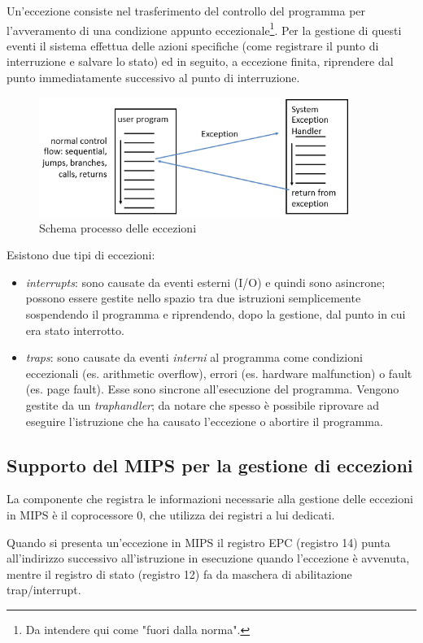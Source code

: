 \documentclass[class=book, crop=false, oneside]{standalone}
\begin{document}
Un'eccezione consiste nel trasferimento del controllo del programma per l'avveramento di una condizione appunto eccezionale\footnote{Da intendere qui come "fuori dalla norma".}.
Per la gestione di questi eventi il sistema effettua delle azioni specifiche (come registrare il punto di interruzione e salvare lo stato) ed in seguito, a eccezione finita, riprendere dal punto immediatamente successivo al punto di interruzione.

\begin{figure}[!h]
	\centering
	\includegraphics[width=0.9\textwidth,keepaspectratio]{schema-eccezioni}
	\caption{Schema processo delle eccezioni}
\end{figure}
Esistono due tipi di eccezioni:
\begin{itemize}
	\item \emph{interrupts}: sono causate da eventi esterni (I/O) e quindi sono asincrone; possono essere gestite nello spazio tra due istruzioni semplicemente sospendendo il programma e riprendendo, dopo la gestione, dal punto in cui era stato interrotto.
	\item \emph{traps}: sono causate da eventi \emph{interni} al programma come condizioni eccezionali (es. arithmetic overflow), errori (es. hardware malfunction) o fault (es. page fault). Esse sono sincrone all'esecuzione del programma. Vengono gestite da un \emph{traphandler}; da notare che spesso è possibile riprovare ad eseguire l'istruzione che ha causato l'eccezione o abortire il programma.
\end{itemize}

\subsection{Supporto del MIPS per la gestione di eccezioni}
La componente che registra le informazioni necessarie alla gestione delle eccezioni in MIPS è il coprocessore 0, che utilizza dei registri a lui dedicati.

Quando si presenta un'eccezione in MIPS il registro EPC (registro 14) punta all'indirizzo successivo all'istruzione in esecuzione quando l'eccezione è avvenuta, mentre il registro di stato (registro 12) fa da maschera di abilitazione trap/interrupt.
\end{document}
